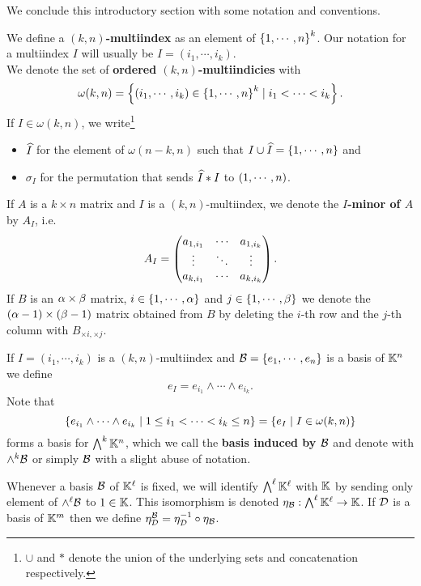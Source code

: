 \noindent We conclude this introductory section with some notation and conventions.
\begin{definition}[Multiindicies]
We define a \textbf{$(k,n)$-multiindex} as an element of $\left\{{1,\cdots, n}\right\}^k$. Our notation for a multiindex $I$ will usually be $I=(i_1,\cdots, i_k)$.\\
We denote the set of \textbf{ordered $(k,n)$-multiindicies} with
\[\omega(k,n)=\left\{{(i_1,\cdots, i_k)\in \left\{{1,\cdots, n}\right\}^k\mid i_1<\cdots<i_k}\right\}.\]
If $I\in \omega(k,n)$, we write\footnote{$\cup$ and $\ast$ denote the union of the underlying sets and concatenation respectively.}
\begin{itemize}
\item $\widehat{I}$ for the element of $\omega(n-k,n)$ such that $I\cup \widehat{I}=\left\{{1,\cdots, n}\right\}$ and 
\item $\sigma_I$ for the permutation that sends $\widehat{I}\ast I$ to $\left({1,\cdots, n}\right)$.
\end{itemize}
If $A$ is a $k\times n$ matrix and $I$ is a $(k,n)$-multiindex, we denote the \textbf{$I$-minor of $A$} by $A_I$, i.e.
\[A_I=\begin{pmatrix}a_{1,i_1} &\cdots &a_{1,i_{k}}\\\vdots &\ddots &\vdots\\a_{k,i_1}&\cdots&a_{k,i_k}\end{pmatrix}.\]
If $B$ is an $\alpha\times \beta$ matrix, $i\in\left\{{1,\cdots, \alpha}\right\}$ and $j\in \left\{{1,\cdots, \beta}\right\}$ we denote the $(\alpha-1)\times (\beta-1)$ matrix obtained from $B$ by deleting the $i$-th row and the $j$-th column with $B_{\times i,\times j}$.
\end{definition}

\begin{remark}
If $I=(i_1,\cdots, i_k)$ is a $(k,n)$-multiindex and $\mathcal{B}=\left\{{e_1,\cdots,e_n}\right\}$ is a basis of $\mathbb{K}^n$ we define
\[e_I=e_{i_1}\wedge\cdots\wedge e_{i_k}.\]
Note that
\[\left\{{e_{i_1}\wedge\cdots\wedge e_{i_k}\mid 1\leq i_1<\cdots<i_k\leq n}\right\}=\left\{{e_I\mid I\in \omega(k,n)}\right\}\]
forms a basis for $\bigwedge^k\mathbb{K}^n$, which we call the \textbf{basis induced by $\mathcal{B}$} and denote with $\wedge^k\mathcal{B}$ or simply $\mathcal{B}$ with a slight abuse of notation.
\end{remark}

\begin{notation}
Whenever a basis $\mathcal{B}$ of $\mathbb{K}^\ell$ is fixed, we will identify $\bigwedge^\ell\mathbb{K}^\ell$ with $\mathbb{K}$ by sending only element of $\wedge^\ell\mathcal{B}$ to $1\in\mathbb{K}$. This isomorphism is denoted $\eta_{\mathcal{B}}:\bigwedge^\ell\mathbb{K}^\ell\to \mathbb{K}$. If $\mathcal{D}$ is a basis of $\mathbb{K}^m$ then we define $\eta^{\mathcal{B}}_{\mathcal{D}}=\eta_{\mathcal{D}}^{-1}\circ \eta_{\mathcal{B}}$.
\end{notation}

